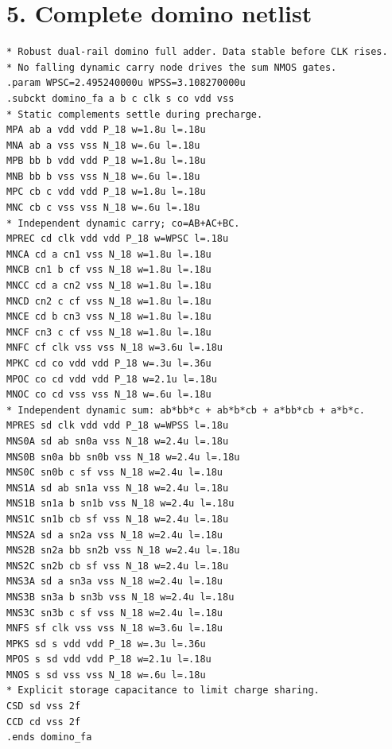 \documentclass[11pt,a4paper]{article}
\begin{document}
\section*{5. Complete domino netlist}
\begin{lstlisting}
* Robust dual-rail domino full adder. Data stable before CLK rises.
* No falling dynamic carry node drives the sum NMOS gates.
.param WPSC=2.495240000u WPSS=3.108270000u
.subckt domino_fa a b c clk s co vdd vss
* Static complements settle during precharge.
MPA ab a vdd vdd P_18 w=1.8u l=.18u
MNA ab a vss vss N_18 w=.6u l=.18u
MPB bb b vdd vdd P_18 w=1.8u l=.18u
MNB bb b vss vss N_18 w=.6u l=.18u
MPC cb c vdd vdd P_18 w=1.8u l=.18u
MNC cb c vss vss N_18 w=.6u l=.18u
* Independent dynamic carry; co=AB+AC+BC.
MPREC cd clk vdd vdd P_18 w=WPSC l=.18u
MNCA cd a cn1 vss N_18 w=1.8u l=.18u
MNCB cn1 b cf vss N_18 w=1.8u l=.18u
MNCC cd a cn2 vss N_18 w=1.8u l=.18u
MNCD cn2 c cf vss N_18 w=1.8u l=.18u
MNCE cd b cn3 vss N_18 w=1.8u l=.18u
MNCF cn3 c cf vss N_18 w=1.8u l=.18u
MNFC cf clk vss vss N_18 w=3.6u l=.18u
MPKC cd co vdd vdd P_18 w=.3u l=.36u
MPOC co cd vdd vdd P_18 w=2.1u l=.18u
MNOC co cd vss vss N_18 w=.6u l=.18u
* Independent dynamic sum: ab*bb*c + ab*b*cb + a*bb*cb + a*b*c.
MPRES sd clk vdd vdd P_18 w=WPSS l=.18u
MNS0A sd ab sn0a vss N_18 w=2.4u l=.18u
MNS0B sn0a bb sn0b vss N_18 w=2.4u l=.18u
MNS0C sn0b c sf vss N_18 w=2.4u l=.18u
MNS1A sd ab sn1a vss N_18 w=2.4u l=.18u
MNS1B sn1a b sn1b vss N_18 w=2.4u l=.18u
MNS1C sn1b cb sf vss N_18 w=2.4u l=.18u
MNS2A sd a sn2a vss N_18 w=2.4u l=.18u
MNS2B sn2a bb sn2b vss N_18 w=2.4u l=.18u
MNS2C sn2b cb sf vss N_18 w=2.4u l=.18u
MNS3A sd a sn3a vss N_18 w=2.4u l=.18u
MNS3B sn3a b sn3b vss N_18 w=2.4u l=.18u
MNS3C sn3b c sf vss N_18 w=2.4u l=.18u
MNFS sf clk vss vss N_18 w=3.6u l=.18u
MPKS sd s vdd vdd P_18 w=.3u l=.36u
MPOS s sd vdd vdd P_18 w=2.1u l=.18u
MNOS s sd vss vss N_18 w=.6u l=.18u
* Explicit storage capacitance to limit charge sharing.
CSD sd vss 2f
CCD cd vss 2f
.ends domino_fa
\end{lstlisting}
\end{document}
